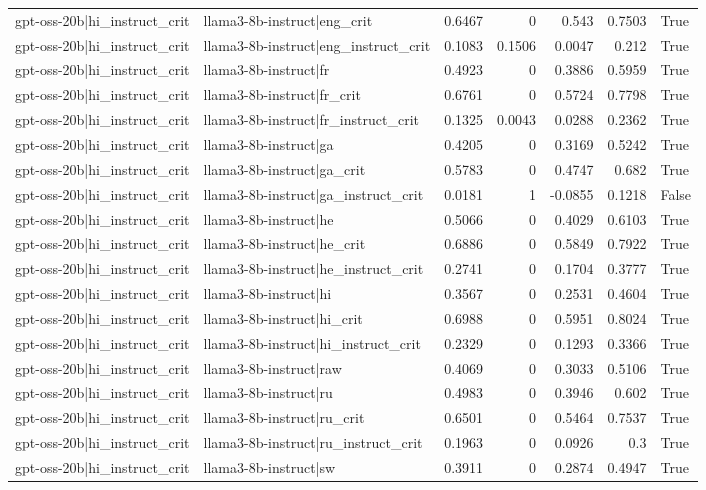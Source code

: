 \begin{table}
\begin{tabular}{l l r r r r l}
gpt-oss-20b|hi_instruct_crit & llama3-8b-instruct|eng_crit & 0.6467 & 0 & 0.543 & 0.7503 & True \\
gpt-oss-20b|hi_instruct_crit & llama3-8b-instruct|eng_instruct_crit & 0.1083 & 0.1506 & 0.0047 & 0.212 & True \\
gpt-oss-20b|hi_instruct_crit & llama3-8b-instruct|fr & 0.4923 & 0 & 0.3886 & 0.5959 & True \\
gpt-oss-20b|hi_instruct_crit & llama3-8b-instruct|fr_crit & 0.6761 & 0 & 0.5724 & 0.7798 & True \\
gpt-oss-20b|hi_instruct_crit & llama3-8b-instruct|fr_instruct_crit & 0.1325 & 0.0043 & 0.0288 & 0.2362 & True \\
gpt-oss-20b|hi_instruct_crit & llama3-8b-instruct|ga & 0.4205 & 0 & 0.3169 & 0.5242 & True \\
gpt-oss-20b|hi_instruct_crit & llama3-8b-instruct|ga_crit & 0.5783 & 0 & 0.4747 & 0.682 & True \\
gpt-oss-20b|hi_instruct_crit & llama3-8b-instruct|ga_instruct_crit & 0.0181 & 1 & -0.0855 & 0.1218 & False \\
gpt-oss-20b|hi_instruct_crit & llama3-8b-instruct|he & 0.5066 & 0 & 0.4029 & 0.6103 & True \\
gpt-oss-20b|hi_instruct_crit & llama3-8b-instruct|he_crit & 0.6886 & 0 & 0.5849 & 0.7922 & True \\
gpt-oss-20b|hi_instruct_crit & llama3-8b-instruct|he_instruct_crit & 0.2741 & 0 & 0.1704 & 0.3777 & True \\
gpt-oss-20b|hi_instruct_crit & llama3-8b-instruct|hi & 0.3567 & 0 & 0.2531 & 0.4604 & True \\
gpt-oss-20b|hi_instruct_crit & llama3-8b-instruct|hi_crit & 0.6988 & 0 & 0.5951 & 0.8024 & True \\
gpt-oss-20b|hi_instruct_crit & llama3-8b-instruct|hi_instruct_crit & 0.2329 & 0 & 0.1293 & 0.3366 & True \\
gpt-oss-20b|hi_instruct_crit & llama3-8b-instruct|raw & 0.4069 & 0 & 0.3033 & 0.5106 & True \\
gpt-oss-20b|hi_instruct_crit & llama3-8b-instruct|ru & 0.4983 & 0 & 0.3946 & 0.602 & True \\
gpt-oss-20b|hi_instruct_crit & llama3-8b-instruct|ru_crit & 0.6501 & 0 & 0.5464 & 0.7537 & True \\
gpt-oss-20b|hi_instruct_crit & llama3-8b-instruct|ru_instruct_crit & 0.1963 & 0 & 0.0926 & 0.3 & True \\
gpt-oss-20b|hi_instruct_crit & llama3-8b-instruct|sw & 0.3911 & 0 & 0.2874 & 0.4947 & True \\

\end{tabular}
\end{table}
